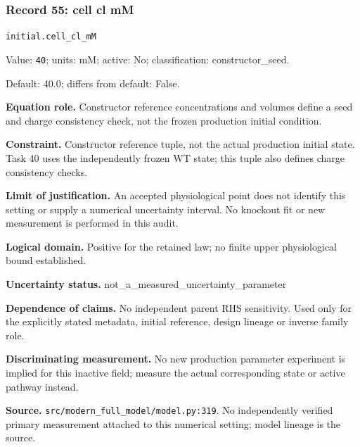 \subsubsection*{Record 55: cell cl mM}
{\small \nolinkurl{initial.cell_cl_mM}\par

Value: \texttt{40}; units: mM; active: No; classification: constructor\_seed.\par

Default: 40.0; differs from default: False.\par

\textbf{Equation role.} Constructor reference concentrations and volumes define a seed and charge consistency check, not the frozen production initial condition.\par

\textbf{Constraint.} Constructor reference tuple, not the actual production initial state. Task 40 uses the independently frozen WT state; this tuple also defines charge consistency checks.\par

\textbf{Limit of justification.} An accepted physiological point does not identify this setting or supply a numerical uncertainty interval. No knockout fit or new measurement is performed in this audit.\par

\textbf{Logical domain.} Positive for the retained law; no finite upper physiological bound established.\par

\textbf{Uncertainty status.} not\_a\_measured\_uncertainty\_parameter\par

\textbf{Dependence of claims.} No independent parent RHS sensitivity. Used only for the explicitly stated metadata, initial reference, design lineage or inverse family role.\par

\textbf{Discriminating measurement.} No new production parameter experiment is implied for this inactive field; measure the actual corresponding state or active pathway instead.\par

\textbf{Source.} \nolinkurl{src/modern_full_model/model.py:319}. No independently verified primary measurement attached to this numerical setting; model lineage is the source.\par}

